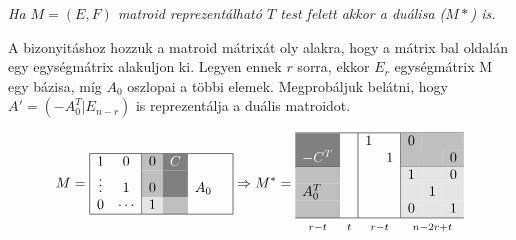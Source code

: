 \emph{Ha $M=(E,F)$ matroid reprezentálható $T$ test felett akkor a duálisa ($M*$) is.}

A bizonyitáshoz hozzuk a matroid mátrixát oly alakra, hogy a mátrix bal oldalán
egy egységmátrix alakuljon ki. Legyen ennek $r$ sorra, ekkor $E_r$ egységmátrix
M egy bázisa, míg $A_0$ oszlopai a többi elemek. Megprobáljuk belátni, hogy $A'=(-A_0^T|E_{n-r})$
is reprezentálja a duális matroidot.

\[ 
M=
\begin{array}{|cc|c|c|rc|}
\hline
1       &  0     & \multicolumn{1}{>{\columncolor{lightgray}}l}{\color{black}0} & \multicolumn{1}{>{\columncolor{gray}}l}{\color{white}C} &     &\\
\vdots &  1     & \multicolumn{1}{>{\columncolor{lightgray}}l}{\color{black}0} &  \multicolumn{1}{>{\columncolor{gray}}l}{\color{white}} & A_0 &\\
0       &  \cdots  & \multicolumn{1}{>{\columncolor{ColorGreyish}}l}{\color{black}1} &\multicolumn{1}{>{\columncolor{lightgray}}l}{\color{black}}   &     &\\
\hline
\end{array}
\Rightarrow
M^*=
\begin{array}{|c|c|cc|lcr|}
\hline
\multicolumn{1}{>{\columncolor{gray}}l}{\color{white}}        & & 1&  &\multicolumn{1}{>{\columncolor{lightgray}}l}{\color{black}0} & \multicolumn{2}{>{\columncolor{lightgray}}l}{\color{black}}  \\
\multicolumn{1}{>{\columncolor{gray}}l}{\color{white}-C^T}    & &  & 1&\multicolumn{2}{>{\columncolor{lightgray}}l}{\color{black}} &\multicolumn{1}{>{\columncolor{lightgray}}l}{\color{black}0}  \\
\cline{1-1} \cline{5-7}
\multicolumn{1}{>{\columncolor{lightgray}}l}{\color{black}}   & &  &  & \multicolumn{1}{>{\columncolor{ColorGreyish}}l}{\color{black}1} & \multicolumn{1}{>{\columncolor{ColorGreyish}}l}{\color{black}} &\multicolumn{1}{>{\columncolor{ColorGreyish}}l}{\color{black}0}  \\
\multicolumn{1}{>{\columncolor{lightgray}}l}{\color{black}A_0^T}     & &  && \multicolumn{1}{>{\columncolor{ColorGreyish}}l}{\color{black}}  & \multicolumn{1}{>{\columncolor{ColorGreyish}}l}{\color{black}1}   & \multicolumn{1}{>{\columncolor{ColorGreyish}}l}{\color{black}} \\
\multicolumn{1}{>{\columncolor{lightgray}}l}{\color{black}} & &  &  & \multicolumn{1}{>{\columncolor{ColorGreyish}}l}{\color{black}0}  & \multicolumn{1}{>{\columncolor{ColorGreyish}}l}{\color{black}}  & \multicolumn{1}{>{\columncolor{ColorGreyish}}l}{\color{black}1} \\ \hline
\multicolumn{1}{c}{\mathsmaller{r-t}} & \multicolumn{1}{c}{\mathsmaller{t}} & \multicolumn{2}{c}{\mathsmaller{r-t}} & \multicolumn{3}{c}{\mathsmaller{n-2r+t}}
\end{array} 
\]

